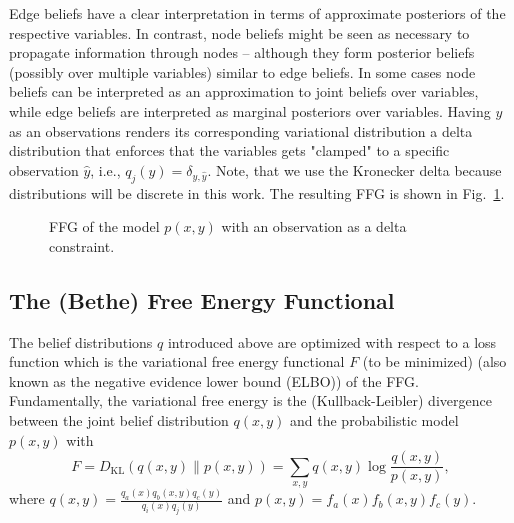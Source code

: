 Edge beliefs have a clear interpretation in terms of approximate posteriors of the respective variables. In contrast, node beliefs might be seen as necessary to propagate information through nodes – although they form posterior beliefs (possibly over multiple variables) similar to edge beliefs. In some cases node beliefs can be interpreted as an approximation to joint beliefs over variables, while edge beliefs are interpreted as marginal posteriors over variables. Having \(y\) as an observations renders its corresponding variational distribution a delta distribution that enforces that the variables gets "clamped" to a specific observation \(\hat{y}\), i.e., \(q_j(y)=\delta_{y,\hat{y}}\). Note, that we use the Kronecker delta because distributions will be discrete in this work. The resulting FFG is shown in Fig.~\ref{fig:5}.
\begin{figure}[htbp]
    \centering


    \caption{FFG of the model \(p(x,y)\) with an observation as a delta constraint.}
    \label{fig:5}
\end{figure}

\subsection{The (Bethe) Free Energy Functional}
The belief distributions \(q\) introduced above are optimized with respect to a loss function which is the variational free energy functional \(F\) (to be minimized) (also known as the negative evidence lower bound (ELBO)) of the FFG. Fundamentally, the variational free energy is the (Kullback-Leibler) divergence between the joint belief distribution \(q(x,y)\) and the probabilistic model \(p(x,y)\) with
\begin{equation}
    F = D_{\mathrm{KL}}(q(x,y) \parallel p(x,y)) = \sum_{x,y} q(x,y) \log \frac{q(x,y)}{p(x,y)},
\end{equation}
where \(q(x,y) = \frac{q_a(x)q_b(x,y)q_c(y)}{q_i(x)q_j(y)}\) and \(p(x,y) = f_a(x)f_b(x,y)f_c(y)\).

